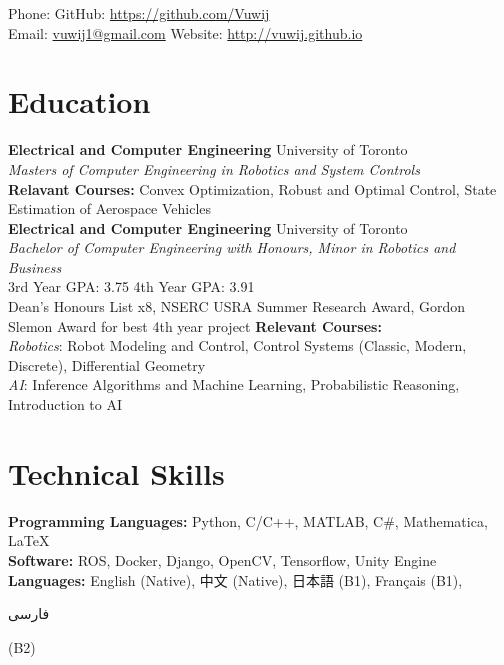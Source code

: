 \documentclass[11pt, a4paper]{cv}
\renewcommand*{\name}{\fontsize{24}{40}\mdseries\upshape}
\begin{document}
\begin{center}
\name{Jason Wang}
\end{center}


Phone: \texttt{} \hfill
GitHub: \href{https://github.com/Vuwij}{https://github.com/Vuwij}\\
Email: \href{mailto:vuwij1@gmail.com}{vuwij1@gmail.com}\hfill
Website: \href{http://vuwij.github.io}{http://vuwij.github.io}

\section*{Education}
\textbf{Electrical and Computer Engineering}
\hfill University of Toronto\\
\emph{Masters of Computer Engineering in Robotics and System Controls}\\
\small{\textbf{Relavant Courses:} Convex Optimization, Robust and Optimal Control, State Estimation of Aerospace Vehicles}\\

\textbf{Electrical and Computer Engineering} \hfill University of Toronto\\
\emph{Bachelor of Computer Engineering with Honours, Minor in Robotics and Business}\\
\small{
	3rd Year GPA: 3.75\hspace{1em}
	4th Year GPA: 3.91\hspace{1em}\\
Dean's Honours List x8, NSERC USRA Summer Research Award, Gordon Slemon Award for best 4th year project
}
\small{\textbf{Relevant Courses:} \\
	\textit{Robotics}: Robot Modeling and Control, Control Systems (Classic, Modern, Discrete), Differential Geometry\\
	\textit{AI}: Inference Algorithms and Machine Learning, Probabilistic Reasoning, Introduction to AI}


\section*{Technical Skills}
\textbf{Programming Languages:} Python, C/C++, MATLAB, C\#, Mathematica, \LaTeX\\[0.2em]
\textbf{Software:} ROS, Docker, Django, OpenCV, Tensorflow, Unity Engine\\[0.2em]
\textbf{Languages:} English (Native), 中文 (Native), 日本語 (B1), Français (B1), \begin{farsi}فارسی\end{farsi} (B2)
\end{document}

